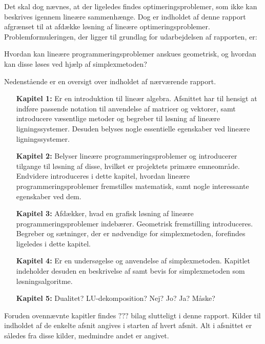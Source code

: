 Det skal dog nævnes, at der ligeledes findes optimeringsproblemer, som ikke kan beskrives igennem lineære sammenhænge. 
Dog er indholdet af denne rapport afgrænset til at afdække løsning af lineære optimeringsproblemer.
Problemformuleringen, der ligger til grundlag for udarbejdelsen af rapporten, er: 
\begin{col}{}{}
Hvordan kan lineære programmeringsproblemer anskues geometrisk, og hvordan kan disse løses ved hjælp af simplexmetoden?
\end{col}
Nedenstående er en oversigt over indholdet af nærværende rapport. 
\begin{itemize}[itemindent=4.6em]
\item[\textbf{Kapitel 1:}] Er en introduktion til lineær algebra.
Afsnittet har til hensigt at indføre passende notation til anvendelse af matricer og vektorer, samt introducere væsentlige metoder og begreber til løsning af lineære ligningssystemer. 
Desuden belyses nogle essentielle egenskaber ved lineære ligningssystemer. 
\item[\textbf{Kapitel 2:}] Belyser lineære programmeringsproblemer og introducerer tilgange til løsning af disse, hvilket er projektets primære emneområde. 
Endvidere introduceres i dette kapitel, hvordan lineære programmeringsproblemer fremstilles matematisk, samt nogle interessante egenskaber ved dem.
\item[\textbf{Kapitel 3:}] Afdækker, hvad en grafisk løsning af lineære programmeringsproblemer indebærer. 
Geometrisk fremstilling introduceres. 
Begreber og sætninger, der er nødvendige for simplexmetoden, forefindes ligeledes i dette kapitel. 
\item[\textbf{Kapitel 4:}] Er en undersøgelse og anvendelse af simplexmetoden. 
Kapitlet indeholder desuden en beskrivelse af samt bevis for simplexmetoden som løsningsalgoritme.
\item[\textbf{Kapitel 5:}] Dualitet? LU-dekomposition? Nej? Jo? Ja? Måske? 
\end{itemize}
%
Foruden ovennævnte kapitler findes $???$ bilag slutteligt i denne rapport.
Kilder til indholdet af de enkelte afsnit angives i starten af hvert afsnit. 
Alt i afsnittet er således fra disse kilder, medmindre andet er angivet. 